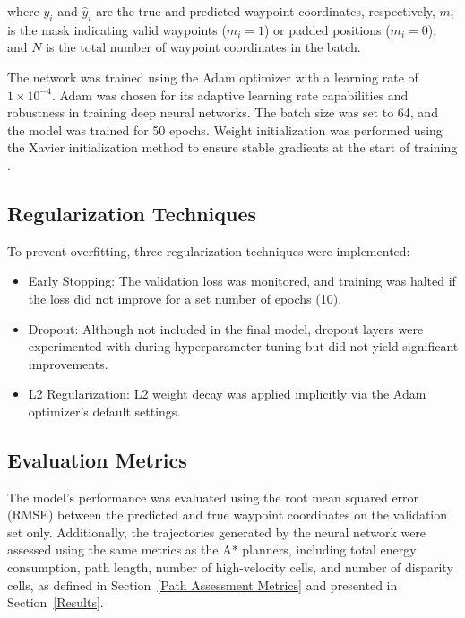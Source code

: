 \documentclass[final,5p,times,twocolumn]{elsarticle}
\begin{document}
\noindent where $y_i$ and $\hat{y}_i$ are the true and predicted waypoint coordinates, respectively, $m_i$ is the mask indicating valid waypoints ($m_i = 1$) or padded positions ($m_i = 0$), and $N$ is the total number of waypoint coordinates in the batch.

The network was trained using the Adam optimizer \cite{Kingma2015} with a learning rate of $1 \times 10^{-4}$. Adam was chosen for its adaptive learning rate capabilities and robustness in training deep neural networks. The batch size was set to 64, and the model was trained for 50 epochs. Weight initialization was performed using the Xavier initialization method to ensure stable gradients at the start of training \cite{Glorot2010}.

\subsection{Regularization Techniques} %

To prevent overfitting, three regularization techniques were implemented:

\begin{itemize} 
    \item Early Stopping: The validation loss was monitored, and training was halted if the loss did not improve for a set number of epochs (10). 
    \item Dropout: Although not included in the final model, dropout layers were experimented with during hyperparameter tuning but did not yield significant improvements. 
    \item L2 Regularization: L2 weight decay was applied implicitly via the Adam optimizer's default settings. 
\end{itemize}

\subsection{Evaluation Metrics} %

The model's performance was evaluated using the root mean squared error (RMSE) between the predicted and true waypoint coordinates on the validation set only. Additionally, the trajectories generated by the neural network were assessed using the same metrics as the A* planners, including total energy consumption, path length, number of high-velocity cells, and number of disparity cells, as defined in Section~\ref{Path Assessment Metrics} and presented in Section~\ref{Results}.
\end{document}
